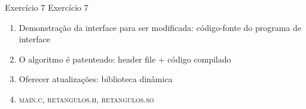 \documentclass{beamer}
\begin{document}
\begin{frame}[fragile]{Exercício 7}
  \centering
  \Large
  Exercício 7
  \begin{enumerate}
    \item <2-> Demonstração da interface para ser modificada: código-fonte do
      programa de interface
    \item <3-> O algoritmo é patenteado: header file + código compilado
    \item <4-> Oferecer atualizações: biblioteca dinâmica
    \item <5-> \textsc{main.c}, \textsc{retangulos.h}, \textsc{retangulos.so}
  \end{enumerate}
\end{frame}
\end{document}

